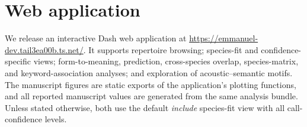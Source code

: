 \documentclass[external]{esp-paper}
\begin{document}
\clearpage
\appendix

\section{Web application}
\label{sec:supp_webapp}

We release an interactive Dash web application at \url{https://emmanuel-dev.tail3ea00b.ts.net/}. It supports repertoire browsing; species-fit and confidence-specific views; form-to-meaning, prediction, cross-species overlap, species-matrix, and keyword-association analyses; and exploration of acoustic--semantic motifs. The manuscript figures are static exports of the application's plotting functions, and all reported manuscript values are generated from the same analysis bundle. Unless stated otherwise, both use the default \emph{include} species-fit view with all call-confidence levels.
\end{document}

